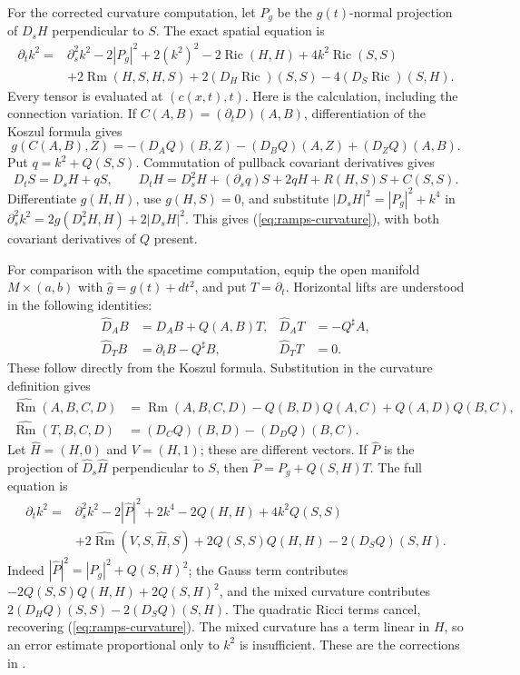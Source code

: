 For the corrected curvature computation, let $P_g$ be the $g(t)$-normal
projection of $D_sH$ perpendicular to $S$.  The exact spatial equation is
\begin{equation}\label{eq:ramps-curvature}
\begin{split}
 \partial_t k^2={}&\partial_s^2k^2-2|P_g|^2+2(k^2)^2
 -2\operatorname{Ric}(H,H)+4k^2\operatorname{Ric}(S,S)\\
 &+2\operatorname{Rm}(H,S,H,S)
 +2(D_H\operatorname{Ric})(S,S)-4(D_S\operatorname{Ric})(S,H).
\end{split}
\end{equation}
Every tensor is evaluated at $(c(x,t),t)$.  Here is the calculation, including
the connection variation.  If $C(A,B)=(\partial_tD)(A,B)$, differentiation
of the Koszul formula gives
\[
 g(C(A,B),Z)=-(D_AQ)(B,Z)-(D_BQ)(A,Z)+(D_ZQ)(A,B).
\]
Put $q=k^2+Q(S,S)$.  Commutation of pullback covariant derivatives gives
\[
 D_tS=D_sH+qS,\qquad
 D_tH=D_s^2H+(\partial_sq)S+2qH+R(H,S)S+C(S,S).
\]
Differentiate $g(H,H)$, use $g(H,S)=0$, and substitute
$|D_sH|^2=|P_g|^2+k^4$ in
$\partial_s^2k^2=2g(D_s^2H,H)+2|D_sH|^2$.
This gives (\ref{eq:ramps-curvature}), with both covariant derivatives of
$Q$ present.

For comparison with the spacetime computation, equip the open manifold
$M\times(a,b)$ with $\widehat g=g(t)+dt^2$, and put $T=\partial_t$.
Horizontal lifts are understood in the following identities:
\begin{align*}
 \widehat D_AB&=D_AB+Q(A,B)T,&
 \widehat D_AT&=-Q^\sharp A,\\
 \widehat D_TB&=\partial_tB-Q^\sharp B,&
 \widehat D_TT&=0.
\end{align*}
These follow directly from the Koszul formula.  Substitution in the curvature
definition gives
\begin{align*}
 \widehat{\operatorname{Rm}}(A,B,C,D)
 &=\operatorname{Rm}(A,B,C,D)-Q(B,D)Q(A,C)+Q(A,D)Q(B,C),\\
 \widehat{\operatorname{Rm}}(T,B,C,D)
 &=(D_CQ)(B,D)-(D_DQ)(B,C).
\end{align*}
Let $\widehat H=(H,0)$ and $V=(H,1)$; these are different vectors.
If $\widehat P$ is the projection of $\widehat D_s\widehat H$
perpendicular to $S$, then
$\widehat P=P_g+Q(S,H)T$.  The full equation is
\begin{equation}\label{eq:ramps-spacetime-curvature}
\begin{split}
 \partial_tk^2={}&\partial_s^2k^2-2|\widehat P|^2+2k^4
 -2Q(H,H)+4k^2Q(S,S)\\
 &+2\widehat{\operatorname{Rm}}(V,S,\widehat H,S)
 +2Q(S,S)Q(H,H)-2(D_SQ)(S,H).
\end{split}
\end{equation}
Indeed $|\widehat P|^2=|P_g|^2+Q(S,H)^2$; the Gauss term contributes
$-2Q(S,S)Q(H,H)+2Q(S,H)^2$, and the mixed curvature contributes
$2(D_HQ)(S,S)-2(D_SQ)(S,H)$.  The quadratic Ricci terms cancel,
recovering (\ref{eq:ramps-curvature}).  The mixed curvature has a term
linear in $H$, so an error estimate proportional only to $k^2$ is
insufficient.  These are the corrections in
\cite[Lemma 0.2, pp.~4--6]{MT2015Correction}.

